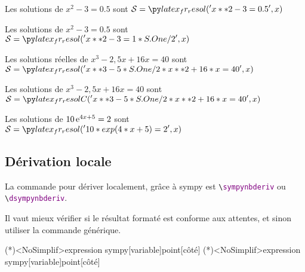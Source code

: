 \documentclass[french,a4paper,11pt]{article}
\newcommand\cmaj[1]{\tcbox[vignetteMaJ]{#1}\xspace}
\begin{document}
\begin{bloctext}
Les solutions de $x^2-3=\num{0.5}$ sont $\mathcal{S}=\dsympyresol{x**2-3=0.5}$

Les solutions de $x^2-3=\num{0.5}$ sont $\mathcal{S}=\dsympyresol{x**2-3=1/2}$
\end{bloctext}

\begin{bloctext}
Les solutions réelles de $x^3-2,5x+16x=40$ sont $\mathcal{S}=\dsympyresol{x**3-5/2*x**2+16*x = 40}$

Les solutions de $x^3-2,5x+16x=40$ sont $\mathcal{S}=\dsympyresolC{x**3-5/2*x**2+16*x = 40}$
\end{bloctext}

\begin{bloctext}
Les solutions de $10\,\mathrm{e}^{4x+5}=2$ sont $\mathcal{S}=\dsympyresol{10*exp(4*x+5)=2}$
\end{bloctext}

\subsection{Dérivation locale}

\begin{cautionblock}
\cmaj{0.1.1} La commande pour dériver localement, grâce à \textsf{sympy} est \texttt{\textbackslash \textcolor{purple}{sympynbderiv}} ou \texttt{\textbackslash \textcolor{purple}{dsympynbderiv}}.

Il vaut mieux vérifier si le résultat formaté est conforme aux attentes, et sinon utiliser la commande générique.
\end{cautionblock}

\begin{bloctext}
\sympynbderiv(*)<NoSimplif>{expression sympy}[variable]{point}[côté]
\dsympynbderiv(*)<NoSimplif>{expression sympy}[variable]{point}[côté]
\end{bloctext}
\end{document}
